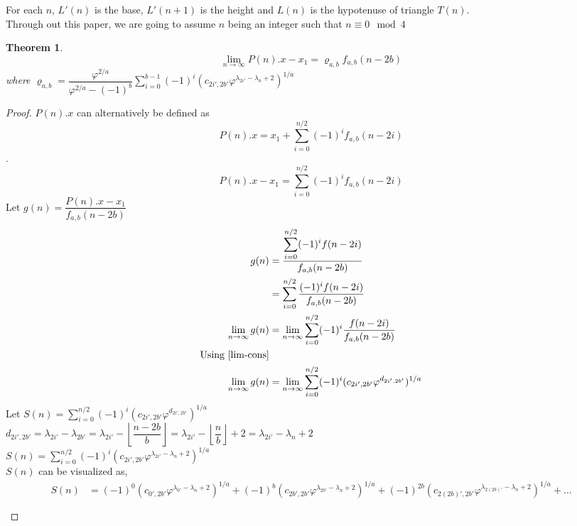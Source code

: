 \documentclass[preprint,12pt]{elsarticle}
\newtheorem{theorem}{Theorem}[section]
\begin{document}
For each $n$, $L'(n)$ is the base, $L'(n + 1)$ is the height and $L(n)$ is the hypotenuse of triangle $T(n)$.\\
Through out this paper, we are going to assume $n$ being an integer such that $n \equiv 0\mod4$
\begin{theorem}
	\label{lim-P}
	$$\lim_{n \to \infty} P(n).x - x_1 = \varrho_{a,b}f_{a,b}(n - 2b)$$
	where $\varrho_{a,b} = \dfrac{\varphi^{2/a}}{\varphi^{2/a} - (-1)^b}\displaystyle\sum_{i = 0}^{b - 1}(-1)^i (c_{2i', 2b'}\varphi^{\lambda_{2i'}-\lambda_{n}+2})^{1/a}$
\end{theorem}
\begin{proof}
	$P(n).x$ can alternatively be defined as $$P(n).x = x_1 + \sum_{i = 0}^{n / 2}(-1)^i f_{a,b}(n-2i)$$.
	$$P(n).x - x_1 = \sum_{i = 0}^{n / 2}(-1)^i f_{a,b}(n-2i)$$
	Let $g(n) = \dfrac{P(n).x - x_1}{f_{a,b}(n - 2b)}$
	\begin{align*}
		g(n)                    & = \dfrac{\displaystyle\sum_{i = 0}^{n / 2}(-1)^i f(n-2i)}{f_{a,b}(n - 2b)}               \\
		                        & = \sum_{i = 0}^{n / 2}\dfrac{(-1)^i f(n-2i)}{f_{a,b}(n - 2b)}                            \\
		\lim_{n \to \infty}g(n) & = \lim_{n \to \infty}\sum_{i = 0}^{n / 2}(-1)^i \dfrac{f(n-2i)}{f_{a,b}(n - 2b)}         \\
		\text{Using \ref{lim-cons}}\\
		\lim_{n \to \infty}g(n) & = \lim_{n \to \infty}\sum_{i = 0}^{n / 2}(-1)^i (c_{2i',2b'}\varphi^{d_{2i',2b'}})^{1/a} 
	\end{align*}
	Let $S(n) = \displaystyle\sum_{i = 0}^{n/2}(-1)^i (c_{2i',2b'}\varphi^{d_{2i',2b'}})^{1/a}$\\
	$d_{2i',2b'} = \lambda_{2i'}-\lambda_{2b'}=\lambda_{2i'}-\left\lfloor\dfrac{n-2b}{b}\right\rfloor = \lambda_{2i'}- \left\lfloor\dfrac{n}{b}\right\rfloor + 2 = \lambda_{2i'}-\lambda_{n}+2$\\
	$S(n) = \displaystyle\sum_{i = 0}^{n/2}(-1)^i (c_{2i',2b'}\varphi^{\lambda_{2i'}-\lambda_{n}+2})^{1/a}$\\
	$S(n)$ can be visualized as,\\
	\begin{align*}
		S(n) & = (-1)^0(c_{0',2b'}\varphi^{\lambda_{0'}-\lambda_{n}+2})^{1/a}+(-1)^{b}(c_{2b',2b'}\varphi^{\lambda_{2b'}-\lambda_{n}+2})^{1/a}+(-1)^{2b}(c_{2(2b)',2b'}\varphi^{\lambda_{2(2b)'}-\lambda_{n}+2})^{1/a}+\ldots \\\\

\end{align*}
\end{proof}
\end{document}
